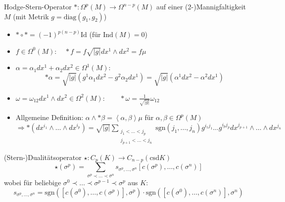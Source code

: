 \documentclass{beamer}
\begin{document}
  \begin{frame}
    \begin{block}{Hodge-Stern-Operator \( *: \Omega^{p}(M) \longrightarrow \Omega^{n-p}(M)\) auf einer (2-)Mannigfaltigkeit \( M \) (mit Metrik \( g = \text{diag}(g_{1}, g_{2}) \))}
      \begin{itemize}
        \item \( * \circ * = (-1)^{p(n-p)}\text{Id} \) \qquad (für \( \text{Ind}(M) = 0 \))
        \item \( f \in \Omega^{0}(M):\quad * f = f \sqrt{|g|} dx^{1}\wedge dx^{2}  = f\mu\) 
        \item \( \alpha = \alpha_{1}dx^{1} + \alpha_{2}dx^{2} \in \Omega^{1}(M):\) 
              \[ *\alpha = \sqrt{|g|} \left( g^{1} \alpha_{1}dx^{2} - g^{2} \alpha_{2}dx^{1} \right) = \sqrt{|g|} \left( \alpha^{1}dx^{2} - \alpha^{2}dx^{1} \right)\]
        \item \( \omega = \omega_{12}dx^{1}\wedge dx^{2} \in \Omega^{2}(M):\qquad *\omega = \frac{1}{\sqrt{|g|}}\omega_{12} \)
        \item Allgemeine Definition: \( \alpha \wedge *\beta = \left\langle \alpha , \beta \right\rangle \mu\) für \( \alpha, \beta \in \Omega^{p}(M) \)\\
              \( \Rightarrow *\left( dx^{i_{1}} \wedge \ldots \wedge dx^{i_{p}} \right) 
                  = \sqrt{|g|} \sum_{\begin{smallmatrix}
                                          j_{1}<\ldots<j_{p} \\
                                          j_{p+1}<\ldots<j_{n}
                                     \end{smallmatrix}} \text{sgn}\left( j_{1}, \ldots, j_{n} \right) g^{i_{1}j_{1}}\ldots g^{i_{p}j_{p}} dx^{j_{p+1}} \wedge \ldots \wedge dx^{j_{n}}\)
      \end{itemize}
    \end{block}
  \end{frame}

  \begin{frame}
    \begin{block}{(Stern-)Dualitätsoperator \( \star: C_{p}(K) \longrightarrow C_{n-p}(\text{csd}K) \)}
      \[ \star(\sigma^{p}) = \sum_{\sigma^{p} \prec \ldots \prec \sigma^{n}} s_{\sigma^{p},\ldots,\sigma^{n}} \left[ c(\sigma^{p}),\ldots,c(\sigma^{n}) \right]  \]
      wobei für beliebige \( \sigma^{0} \prec \ldots \prec \sigma^{p-1} \prec \sigma^{p} \) aus \( K \):
      \[ s_{\sigma^{p},\ldots,\sigma^{n}} = \text{sgn}\left( \left[ c(\sigma^{0}),\ldots,c(\sigma^{p}) \right], \sigma^{p} \right) 
                                      \cdot \text{sgn}\left( \left[ c(\sigma^{0}),\ldots,c(\sigma^{n}) \right], \sigma^{n} \right) \]
    \end{block}
  \end{frame}
\end{document}
